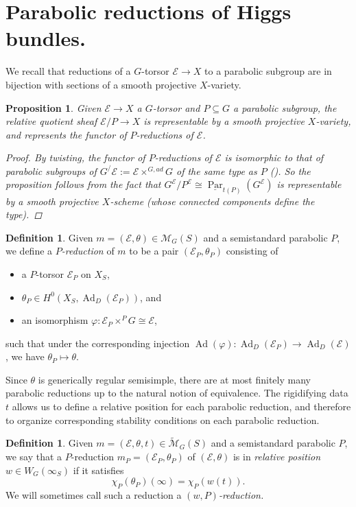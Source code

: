 \documentclass[openany]{amsbook}
\newtheorem{proposition}[theorem]{Proposition}
\theoremstyle{definition}
\newtheorem{definition}[theorem]{Definition}
\theoremstyle{remark}
\numberwithin{equation}{section}
\newcommand{\cM}{\mathcal{M}}
\newcommand{\cE}{\mathcal{E}}
\newcommand{\ul}[1]{\underline{#1}}
\renewcommand{\phi}{\varphi}
\renewcommand{\-}{\operatorname{-}}
\newcommand{\on}[1]{\operatorname{#1}}
\newcommand{\ctM}{\widetilde{\cM}}
\begin{document}
\section{Parabolic reductions of Higgs bundles.}

We recall that reductions of a $G$-torsor $\cE \to X$ to a parabolic subgroup are in bijection with sections of a smooth projective $X$-variety.
\begin{proposition}
     Given $\cE \to X$ a $G$-torsor and $P \subseteq G$ a parabolic subgroup, the relative quotient sheaf $\cE/P \to X$ is representable by a smooth projective $X$-variety, and represents the functor of $P$-reductions of $\cE$. 
    \begin{proof}
        By twisting, the functor of $P$-reductions of $\cE$ is isomorphic to that of parabolic subgroups of $G^/{\cE} := \cE \times^{G, ad} G$ of the same type as $P$ (\cite[Exp. XXVI, 3.20]{SGAIII}). So the proposition follows from the fact that $G^{\cE}/P^{\cE} \cong \ul{\on{Par}}_{t(P)}(G^{\cE})$ is representable by a smooth projective $X$-scheme \cite[Exp. XXVI, 3.20]{SGAIII} (whose connected components define the type).
    \end{proof}
\end{proposition}

\begin{definition}\label{def.P.red}
    Given $m = (\cE, \theta) \in \cM_G(S)$ and a semistandard parabolic $P$, we define a \textit{$P$-reduction} of $m$ to be a pair $(\cE_P, \theta_P)$ consisting of 
    \begin{itemize} 
    \item a $P$-torsor $\cE_P$ on $X_S$,
    \item $\theta_P \in H^0(X_S, \on{Ad}_D(\cE_P))$, and
    \item an isomorphism $\phi : \cE_P \times^P G \cong \cE$,
    \end{itemize}
        such that under the corresponding injection $\on{Ad}(\phi) : \on{Ad}_D(\cE_P) \to \on{Ad}_D(\cE)$, we have $\theta_P \mapsto \theta$.
\end{definition}

Since $\theta$ is generically regular semisimple, there are at most finitely many parabolic reductions up to the natural notion of equivalence. The rigidifying data $t$ allows us to define a relative position for each parabolic reduction, and therefore to organize corresponding stability conditions on each parabolic reduction.

\begin{definition}\label{def.rel.pos}
    Given $m = (\cE, \theta, t) \in \ctM_G(S)$ and a semistandard parabolic $P$, we say that a $P$-reduction $m_P = (\cE_P, \theta_P)$ of $(\cE, \theta)$ is in \textit{relative position }$w \in W_G(\infty_S)$ if it satisfies 
    $$\chi_P(\theta_P)(\infty) = \chi_P(w(t)).$$
    We will sometimes call such a reduction a \textit{$(w, P)$-reduction. } 
\end{definition}
\end{document}
